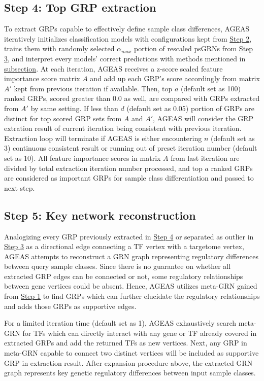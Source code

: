 \documentclass[fleqn,10pt]{wlscirep}
\begin{document}
  \subsection*{Step 4: Top GRP extraction}
    \label{step4}
    To extract GRPs capable to effectively define sample class differences, AGEAS iteratively initializes classification models with configurations kept from \hyperref[step2]{Step 2}, trains them with randomly selected $\alpha_{max}$ portion of rescaled psGRNs from \hyperref[step3]{Step 3}, and interpret every models' correct predictions with methods mentioned in \hyperref[features_importances]{subsection}.
    At each iteration, AGEAS receives a z-score scaled feature importance score matrix $A$ and add up each GRP's score accordingly from matrix $A'$ kept from previous iteration if available.
    Then, top $a$ (default set as 100) ranked GRPs, scored greater than $0.0$ as well, are compared with GRPs extracted from $A'$ by same setting.
    If less than $d$ (default set as 0.05) portion of GRPs are distinct for top scored GRP sets from $A$ and $A'$, AGEAS will consider the GRP extration result of current iteration being consistent with previous iteration.
    Extraction loop will terminate if AGEAS is either encountering $n$ (default set as 3) continuous consistent result or running out of preset iteration number (default set as 10).
    All feature importance scores in matrix $A$ from last iteration are divided by total extraction iteration number processed, and top $a$ ranked GRPs are considered as important GRPs for sample class differentiation and passed to next step.

  \subsection*{Step 5: Key network reconstruction}
    \label{step5}
    Analogizing every GRP previously extracted in \hyperref[step4]{Step 4} or separated as outlier in \hyperref[step3]{Step 3} as a directional edge connecting a TF vertex with a targetome vertex, AGEAS attempts to reconstruct a GRN graph representing regulatory differences between query sample classes.
    Since there is no guarantee on whether all extracted GRP edges can be connected or not, some regulatory relationships between gene vertices could be absent.
    Hence, AGEAS utilizes meta-GRN gained from \hyperref[step1]{Step 1} to find GRPs which can further elucidate the regulatory relationships and adds those GRPs as supportive edges.

    For a limited iteration time (default set as  1), AGEAS exhaustively search meta-GRN for TFs which can directly interact with any gene or TF already covered in extracted GRPs and add the returned TFs as new vertices.
    Next, any GRP in meta-GRN capable to connect two distinct vertices will be included as supportive GRP in extraction result.
    After expansion procedure above, the extracted GRN graph represents key genetic regulatory differences between input sample classes.
\end{document}
